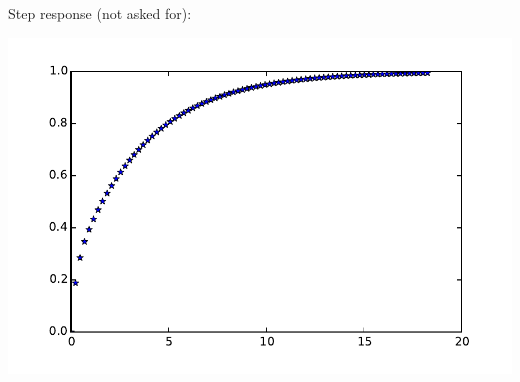 \documentclass{scrartcl}
\begin{document}
\begin{enumerate}
      Step response (not asked for):
      \begin{center}
      \includegraphics[width=0.7\linewidth]{stepresponse}
      \end{center}
\end{enumerate}
\end{document}
